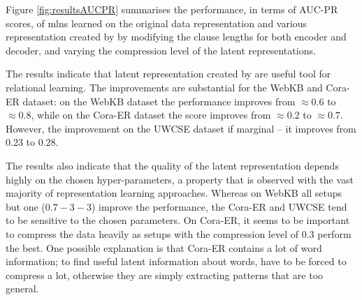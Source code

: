 Figure \ref{fig:resultsAUCPR} summarises the performance, in terms of AUC-PR scores, of \gls{mln}s learned on the original data representation and various representation created by  by modifying the clause lengths for both encoder and decoder, and varying the compression level of the latent representations.




The results indicate that latent representation created by  are useful tool for relational learning.
The improvements are substantial for the WebKB and Cora-ER dataset: on the WebKB dataset the performance improves from $\approx 0.6$ to $\approx 0.8$, while on the Cora-ER dataset the score improves from $\approx 0.2$ to $\approx 0.7$.
However, the improvement on the UWCSE dataset if marginal -- it improves from $0.23$ to $0.28$.



The results also indicate that the quality of the latent representation depends highly on the chosen hyper-parameters, a property that is observed with the vast majority of representation learning approaches.
Whereas on WebKB all setups but one ($0.7-3-3$) improve the performance, the Cora-ER and UWCSE tend to be sensitive to the chosen parameters.
On Cora-ER, it seems to be important to compress the data heavily as setups with the compression level of $0.3$ perform the best.
One possible explanation is that Cora-ER contains a lot of word information; to find useful latent information about words,  have to be forced to compress a lot, otherwise they are simply extracting patterns that are too general.

